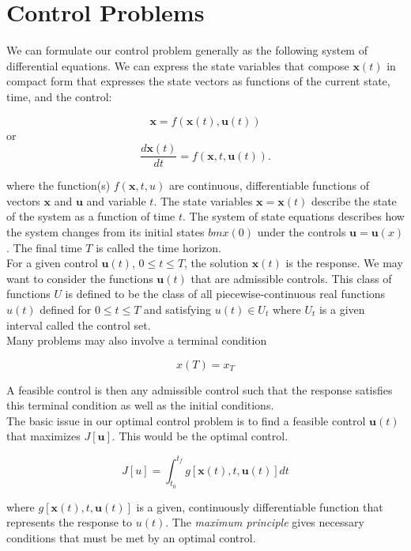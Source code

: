 \documentclass[12pt, oneside]{article}   	%
\begin{document}
 

\section*{Control Problems} \label{mathrefs}

\noindent We can formulate our control problem generally as the following system of differential equations. We can express the state variables that compose $\bm{x}(t)$ in compact form that expresses the state vectors as functions of the current state, time, and the control:

$$ \bm{x} = f(\bm{x}(t),\bm{u}(t)) $$ \noindent or $$ \frac{d\bm{x}(t)}{dt} = f(\bm{x},t,\bm{u}(t)). $$ 

\noindent where the function(s) $f(\bm{x},t,{u})$ are continuous, differentiable functions of vectors $\bm{x}$ and $\bm{u}$ and variable $t$. The state variables $\bm{x}=\bm{x}(t)$ describe the state of the system as a function of time $t$. The system of state equations describes how the system changes from its initial states $bm{x}(0)$ under the controls $\bm{u}=\bm{u}(x)$. The final time $T$ is called the time horizon. \\

\noindent For a given control $\bm{u}(t)$, $0\leq t \leq T$, the solution $\bm{x}(t)$ is the response. We may want to consider the functions $\bm{u}(t)$ that are admissible controls. This class of functions $U$ is defined to be the class of all piecewise-continuous real functions $u(t)$ defined for $0\leq t \leq T$ and satisfying $u(t) \in U_t$ where $U_t$ is a given interval called the control set. \\

\noindent Many problems may also involve a terminal condition

$$ x(T) = x_T $$ 

\noindent A feasible control is then any admissible control such that the response satisfies this terminal condition as well as the initial conditions. \\

\noindent The basic issue in our optimal control problem is to find a feasible control $\bm{u}(t)$ that maximizes $J[\bm{u}]$. This would be the optimal control. 

$$ J[u] = \int_{t_0}^{t_f} g[\bm{x}(t), t, \bm{u}(t)] dt $$

\noindent where $g[\bm{x}(t), t, \bm{u}(t)]$ is a given, continuously differentiable function that represents the response to $u(t)$. The \textit{maximum principle} gives necessary conditions that must be met by an optimal control. \\
\end{document}

